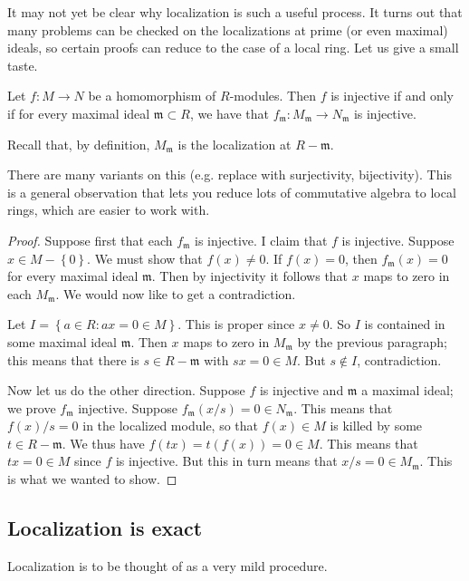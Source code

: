 It may not yet be clear why localization is such a useful process. It turns
out that many problems can be checked on the localizations at prime (or even
maximal) ideals, so certain proofs can reduce to the case of a local ring.
Let us give a small taste.

\begin{proposition}
Let $f: M \to N$ be a homomorphism of $R$-modules.  Then $f$ is injective if
and only if for every maximal ideal $\mathfrak{m} \subset R$, we have that
$f_{\mathfrak{m}}: M_{\mathfrak{m}} \to N_{\mathfrak{m}}$ is injective.
\end{proposition}
Recall that, by definition, $M_{\mathfrak{m}}$ is the localization at $R -
\mathfrak{m}$.

There are many variants on this (e.g. replace with surjectivity, bijectivity).
This is a general observation that lets you reduce lots of commutative algebra
to local rings, which are easier to work with.

\begin{proof}
Suppose first that each $f_{\mathfrak{m}}$ is injective.  I claim that $f$ is
injective.  Suppose $x \in M - \left\{0\right\}$. We must show that $f(x) \neq
0$. If $f(x)=0$, then $f_{\mathfrak{m}}(x)=0$ for every maximal ideal
$\mathfrak{m}$.  Then by
injectivity it follows that $x$ maps to zero in each $M_{\mathfrak{m}}$.
We would now like to get a contradiction.

Let $I = \left\{ a \in R: ax = 0 \in M \right\}$.  This is proper since $x \neq
0$.  So $I$ is contained in some maximal ideal $\mathfrak{m}$.  Then $x$
maps to zero in $M_{\mathfrak{m}}$ by the previous paragraph; this means that
there is $s \in R - \mathfrak{m}$ with $sx = 0 \in M$. But $s \notin I$,
contradiction.

Now let us do the other direction. Suppose $f$ is injective and $\mathfrak{m}$
a maximal ideal; we prove $f_{\mathfrak{m}}$ injective.  Suppose
$f_{\mathfrak{m}}(x/s)=0 \in N_{\mathfrak{m}}$. This means that $f(x)/s=0$ in
the localized module, so that $f(x) \in M$ is killed by some $t \in R -
\mathfrak{m}$.  We thus have $f(tx) = t(f(x)) = 0 \in M$.  This means that $tx
= 0 \in M$ since $f$ is injective. But this in turn means that $x/s = 0 \in
M_{\mathfrak{m}}$. This is what we wanted to show.
\end{proof}



\subsection{Localization is exact}
Localization is to be thought of as a very mild procedure.


